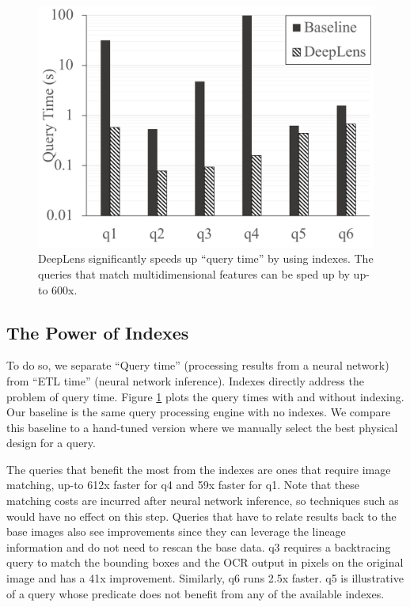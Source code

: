 \begin{figure}[t]
\centering
 \includegraphics[width=0.8\columnwidth]{figures/query.png}
 \caption{\textsf{DeepLens} significantly speeds up ``query time'' by using indexes. The queries that match multidimensional features can be sped up by up-to 600x.  \label{query} }
\end{figure}

\subsection{The Power of Indexes}
To do so, we separate ``Query time'' (processing results from a neural network) from ``ETL time'' (neural network inference). 
Indexes directly address the problem of query time.
Figure \ref{query} plots the query times with and without indexing.
Our baseline is the same query processing engine with no indexes.
We compare this baseline to a hand-tuned version where we manually select the best physical design for a query.

The queries that benefit the most from the indexes are ones that require image matching, up-to 612x faster for q4 and 59x faster for q1. Note that these matching costs are incurred after neural network inference, so techniques such as~\cite{kang2017noscope, anderson2018predicate, kang2018blazeit} would have no effect on this step.
Queries that have to relate results back to the base images also see improvements since they can leverage the lineage information and do not need to rescan the base data.
q3 requires a backtracing query to match the bounding boxes and the OCR output in pixels on the original image and has a 41x improvement. Similarly, q6 runs 2.5x faster. q5 is illustrative of a query whose predicate does not benefit from any of the available indexes.


